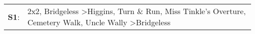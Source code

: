 \begin{supertabular}{p{0.03\textwidth}p{0.92\textwidth}}
 \textbf{S1}:  &  2x2\textsuperscript{}, \enspace Bridgeless\textsuperscript{} \textgreater \enspace Higgins\textsuperscript{}, \enspace Turn \& Run\textsuperscript{}, \enspace Miss Tinkle's Overture\textsuperscript{}, \enspace Cemetery Walk\textsuperscript{}, \enspace Uncle Wally\textsuperscript{} \textgreater \enspace Bridgeless\textsuperscript{}  \enspace  \\
\end{supertabular}
